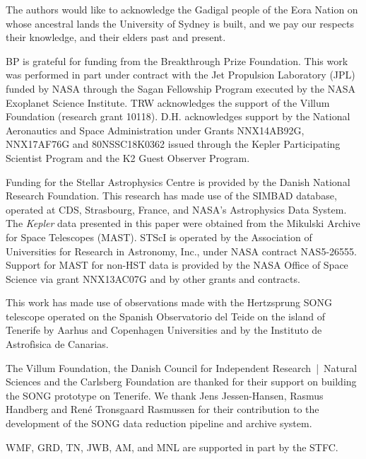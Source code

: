 \documentclass[modern]{aastex61}
\newcommand{\kepler}{\emph{Kepler}\xspace}
\begin{document}
The authors would like to acknowledge the Gadigal people of the Eora Nation on whose ancestral lands the University of Sydney is built, and we pay our respects their knowledge, and their elders past and present.


BP is grateful for funding from the Breakthrough Prize Foundation. This work was performed in part under contract with the Jet Propulsion Laboratory (JPL) funded by NASA through the Sagan Fellowship Program executed by the NASA Exoplanet Science Institute.
TRW acknowledges the support of the Villum Foundation (research grant 10118).
D.H. acknowledges support by the National Aeronautics and Space Administration under Grants NNX14AB92G, NNX17AF76G and 80NSSC18K0362 issued through the Kepler Participating Scientist Program and the K2 Guest Observer Program.

Funding for the Stellar Astrophysics Centre is provided by the Danish National Research Foundation.
This research has made use of the SIMBAD database, operated at CDS, Strasbourg, France, and NASA's Astrophysics Data System. The \kepler data presented in this paper were obtained from the Mikulski Archive for Space Telescopes (MAST). STScI is operated by the Association of Universities for Research in Astronomy, Inc., under NASA contract NAS5-26555. Support for MAST for non-HST data is provided by the NASA Office of Space Science via grant NNX13AC07G and by other grants and contracts.

This work has made use of observations made with the Hertzsprung SONG telescope operated on the Spanish Observatorio
  del Teide on the island of Tenerife by Aarhus and Copenhagen Universities and by the Instituto de
  Astrof\`{i}sica de Canarias.

The Villum Foundation, the Danish Council for Independent Research~|~Natural Sciences and
 the Carlsberg Foundation are thanked for their support on building the SONG prototype on
 Tenerife.
 We thank Jens Jessen-Hansen, Rasmus Handberg and René Tronsgaard Rasmussen for their contribution
 to the development of the SONG data reduction pipeline and archive system.

 WMF, GRD, TN, JWB, AM, and MNL are supported in part by the STFC.

\end{document}
